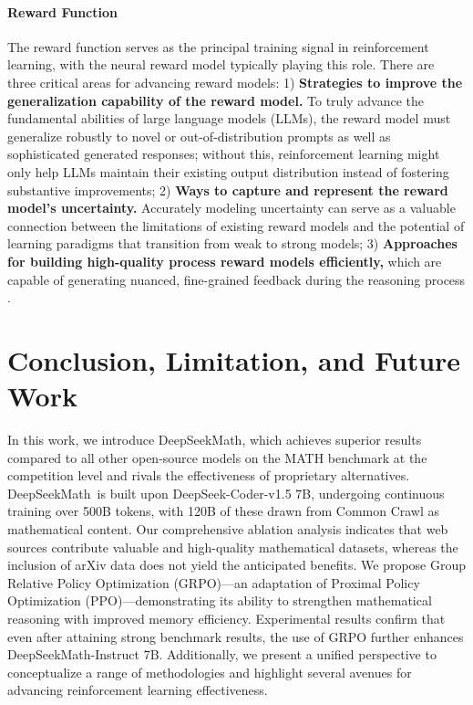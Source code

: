 \begin{itemize}[topsep=0pt]
\begin{itemize}[topsep=0pt]
\paragraph{Reward Function} The reward function serves as the principal training signal in reinforcement learning, with the neural reward model typically playing this role. There are three critical areas for advancing reward models: 1) \textbf{Strategies to improve the generalization capability of the reward model.} To truly advance the fundamental abilities of large language models (LLMs), the reward model must generalize robustly to novel or out-of-distribution prompts as well as sophisticated generated responses; without this, reinforcement learning might only help LLMs maintain their existing output distribution instead of fostering substantive improvements; 2) \textbf{Ways to capture and represent the reward model's uncertainty.} Accurately modeling uncertainty can serve as a valuable connection between the limitations of existing reward models and the potential of learning paradigms that transition from weak to strong models; 3) \textbf{Approaches for building high-quality process reward models efficiently,} which are capable of generating nuanced, fine-grained feedback during the reasoning process \citep{lightman2023let,wang2023math}.

\section{Conclusion, Limitation, and Future Work}  
In this work, we introduce DeepSeekMath, which achieves superior results compared to all other open-source models on the MATH benchmark at the competition level and rivals the effectiveness of proprietary alternatives. DeepSeekMath~is built upon DeepSeek-Coder-v1.5 7B, undergoing continuous training over 500B tokens, with 120B of these drawn from Common Crawl as mathematical content. Our comprehensive ablation analysis indicates that web sources contribute valuable and high-quality mathematical datasets, whereas the inclusion of arXiv data does not yield the anticipated benefits. We propose Group Relative Policy Optimization (GRPO)—an adaptation of Proximal Policy Optimization (PPO)—demonstrating its ability to strengthen mathematical reasoning with improved memory efficiency. Experimental results confirm that even after attaining strong benchmark results, the use of GRPO further enhances DeepSeekMath-Instruct 7B. Additionally, we present a unified perspective to conceptualize a range of methodologies and highlight several avenues for advancing reinforcement learning effectiveness.


\end{itemize}
\end{itemize}
